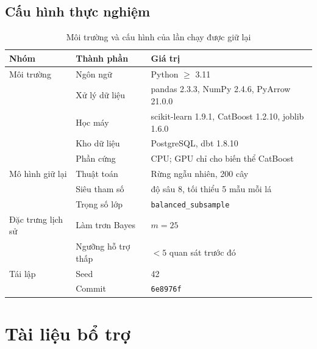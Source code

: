 \documentclass[12pt,a4paper]{report}
\begin{document}
\section{Cấu hình thực nghiệm}\label{app:env}
\begin{table}[htbp]\centering\small
\caption{Môi trường và cấu hình của lần chạy được giữ lại}\label{tab:app-env}
\begin{tabular}{L{2.6cm}L{4.2cm}L{6.6cm}}
\toprule
Nhóm & Thành phần & Giá trị \\
\midrule
Môi trường & Ngôn ngữ & Python $\geq$ 3.11 \\
           & Xử lý dữ liệu & pandas 2.3.3, NumPy 2.4.6, PyArrow 21.0.0 \\
           & Học máy & scikit-learn 1.9.1, CatBoost 1.2.10, joblib 1.6.0 \\
           & Kho dữ liệu & PostgreSQL, dbt 1.8.10 \\
           & Phần cứng & CPU; GPU chỉ cho biến thể CatBoost \\
\midrule
Mô hình giữ lại & Thuật toán & Rừng ngẫu nhiên, 200 cây \\
           & Siêu tham số & độ sâu 8, tối thiểu 5 mẫu mỗi lá \\
           & Trọng số lớp & \texttt{balanced\_subsample} \\
\midrule
Đặc trưng lịch sử & Làm trơn Bayes & $m = 25$ \\
           & Ngưỡng hỗ trợ thấp & $< 5$ quan sát trước đó \\
\midrule
Tái lập    & Seed & 42 \\
           & Commit & \texttt{6e8976f} \\
\bottomrule
\end{tabular}
\end{table}
 \chapter{Tài liệu bổ trợ}
\end{document}
